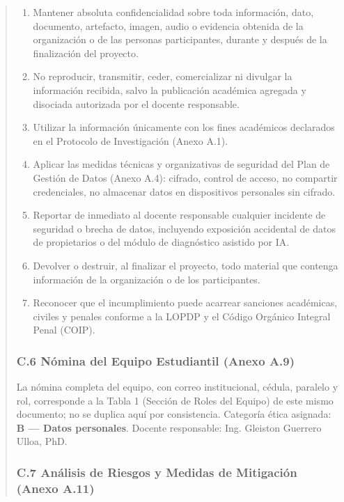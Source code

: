\documentclass[
]{article}
\begin{document}
\begin{quote}
\begin{enumerate}
  \item Mantener absoluta confidencialidad sobre toda información, dato, documento, artefacto, imagen, audio o evidencia obtenida de la organización o de las personas participantes, durante y después de la finalización del proyecto.
  \item No reproducir, transmitir, ceder, comercializar ni divulgar la información recibida, salvo la publicación académica agregada y disociada autorizada por el docente responsable.
  \item Utilizar la información únicamente con los fines académicos declarados en el Protocolo de Investigación (Anexo A.1).
  \item Aplicar las medidas técnicas y organizativas de seguridad del Plan de Gestión de Datos (Anexo A.4): cifrado, control de acceso, no compartir credenciales, no almacenar datos en dispositivos personales sin cifrado.
  \item Reportar de inmediato al docente responsable cualquier incidente de seguridad o brecha de datos, incluyendo exposición accidental de datos de propietarios o del módulo de diagnóstico asistido por IA.
  \item Devolver o destruir, al finalizar el proyecto, todo material que contenga información de la organización o de los participantes.
  \item Reconocer que el incumplimiento puede acarrear sanciones académicas, civiles y penales conforme a la LOPDP y el Código Orgánico Integral Penal (COIP).
\end{enumerate}

\subsubsection{C.6 Nómina del Equipo Estudiantil (Anexo A.9)}\label{c6-nomina-equipo}

La nómina completa del equipo, con correo institucional, cédula, paralelo y rol, corresponde a la Tabla 1 (Sección de Roles del Equipo) de este mismo documento; no se duplica aquí por consistencia. Categoría ética asignada: \textbf{B --- Datos personales}. Docente responsable: Ing. Gleiston Guerrero Ulloa, PhD.

\subsubsection{C.7 Análisis de Riesgos y Medidas de Mitigación (Anexo A.11)}\label{c7-analisis-riesgos}


\end{quote}
\end{document}
